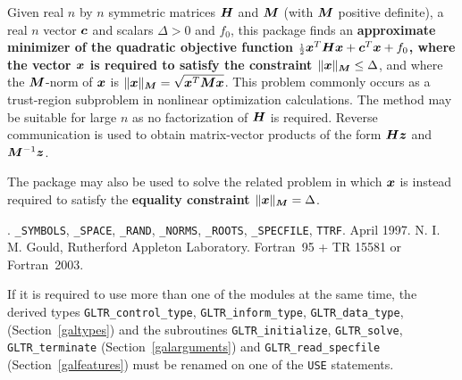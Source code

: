 \documentclass{galahad}
\newcommand{\packagename}{GL\-TR}
\newcommand{\fullpackagename}{\libraryname\_\packagename}
\begin{document}
\galheader


\galsummary
Given real $n$ by $n$ symmetric matrices ${\bm{H}}$ and ${\bm{M}}$
(with ${\bm{M}}$ positive definite), a real
$n$ vector ${\bm{c}}$ and scalars $\Delta>0$ and $f_0$, this package finds an
{\bf approximate minimizer of the quadratic objective function
${\scriptstyle \frac{1}{2}} {\bm{x}}^T {\bm{H}} {\bm{x}}  +  {\bm{c}}^T {\bm{x}} + f_0$, where the vector ${\bm{x}}$ is
required to satisfy the constraint $\|{\bm{x}}\|_{{\bm{M}}} \leq  \Delta$}, and
where the ${\bm{M}}$-norm of ${\bm{x}}$ is $\|{\bm{x}}\|_{{\bm{M}}} = \sqrt{{\bm{x}}^T {\bm{M}} {\bm{x}}}$.
This problem commonly occurs as a trust-region subproblem in nonlinear
optimization calculations.
The method may be suitable for large $n$ as no factorization of ${\bm{H}}$ is
required. Reverse communication is used to obtain
matrix-vector products of the form ${\bm{H}} {\bm{z}}$ and ${\bm{M}}^{-1} {\bm{z}}$.

\noindent
The package may also be used to solve the related problem in which ${\bm{x}}$ is
instead required to satisfy the
{\bf equality constraint $\|{\bm{x}}\|_{{\bm{M}}} = \Delta$}.


\galattributes
\galversions{\tt  \fullpackagename\_single, \fullpackagename\_double}.
\galuses
{\tt \libraryname\_SY\-M\-BOLS},
{\tt \libraryname\_SPACE}, {\tt \libraryname\_\-RAND},
{\tt \libraryname\_\-NORMS},
{\tt \libraryname\_ROOTS}, {\tt \libraryname\_SPECFILE},
{\tt *TTRF}.
\galdate April 1997.
\galorigin N. I. M. Gould, Rutherford Appleton Laboratory.
\gallanguage Fortran~95 + TR 15581 or Fortran~2003.


\galhowto



\noindent
If it is required to use more than one of the modules at the same time, 
the derived types
{\tt \packagename\_control\_type}, {\tt \packagename\_inform\_type},
{\tt \packagename\_data\_type},
(Section~\ref{galtypes})
and the subroutines
{\tt \packagename\_initialize},
{\tt \packagename\_solve}, {\tt \packagename\_terminate}
(Section~\ref{galarguments})
and
{\tt \packagename\_read\_specfile}
(Section~\ref{galfeatures})
must be renamed on one of the {\tt USE} statements.



\end{document}
